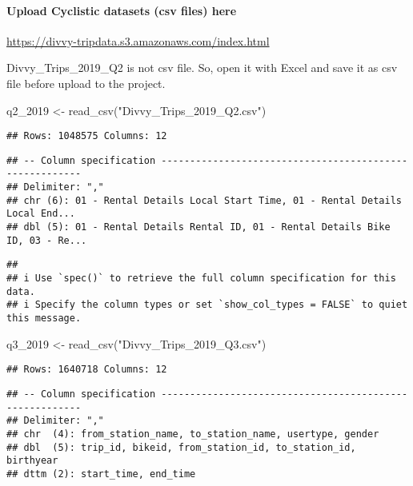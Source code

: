 \documentclass[
]{article}
\newenvironment{Shaded}{\begin{snugshade}}{\end{snugshade}}
\newcommand{\FunctionTok}[1]{\textcolor[rgb]{0.00,0.00,0.00}{#1}}
\newcommand{\NormalTok}[1]{#1}
\newcommand{\OtherTok}[1]{\textcolor[rgb]{0.56,0.35,0.01}{#1}}
\newcommand{\StringTok}[1]{\textcolor[rgb]{0.31,0.60,0.02}{#1}}
\begin{document}
\hypertarget{upload-cyclistic-datasets-csv-files-here}{%
\paragraph{Upload Cyclistic datasets (csv files)
here}\label{upload-cyclistic-datasets-csv-files-here}}

\url{https://divvy-tripdata.s3.amazonaws.com/index.html}

Divvy\_Trips\_2019\_Q2 is not csv file. So, open it with Excel and save
it as csv file before upload to the project.

\begin{Shaded}
\begin{Highlighting}[]
\NormalTok{q2\_2019 }\OtherTok{\textless{}{-}} \FunctionTok{read\_csv}\NormalTok{(}\StringTok{"Divvy\_Trips\_2019\_Q2.csv"}\NormalTok{)}
\end{Highlighting}
\end{Shaded}

\begin{verbatim}
## Rows: 1048575 Columns: 12
\end{verbatim}

\begin{verbatim}
## -- Column specification --------------------------------------------------------
## Delimiter: ","
## chr (6): 01 - Rental Details Local Start Time, 01 - Rental Details Local End...
## dbl (5): 01 - Rental Details Rental ID, 01 - Rental Details Bike ID, 03 - Re...
\end{verbatim}

\begin{verbatim}
## 
## i Use `spec()` to retrieve the full column specification for this data.
## i Specify the column types or set `show_col_types = FALSE` to quiet this message.
\end{verbatim}

\begin{Shaded}
\begin{Highlighting}[]
\NormalTok{q3\_2019 }\OtherTok{\textless{}{-}} \FunctionTok{read\_csv}\NormalTok{(}\StringTok{"Divvy\_Trips\_2019\_Q3.csv"}\NormalTok{)}
\end{Highlighting}
\end{Shaded}

\begin{verbatim}
## Rows: 1640718 Columns: 12
\end{verbatim}

\begin{verbatim}
## -- Column specification --------------------------------------------------------
## Delimiter: ","
## chr  (4): from_station_name, to_station_name, usertype, gender
## dbl  (5): trip_id, bikeid, from_station_id, to_station_id, birthyear
## dttm (2): start_time, end_time
\end{verbatim}
\end{document}
